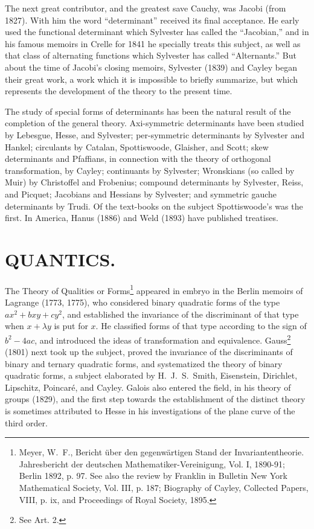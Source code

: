 \documentclass[oneside]{book}
\begin{document}
{The next great contributor, and the greatest save Cauchy, was Jacobi
(from 1827). With him the word ``determinant'' received its final
acceptance. He early used the functional determinant which Sylvester
has called the ``Jacobian,'' and in his famous memoirs in Crelle for
1841 he specially treats this subject, as well as that class of
alternating functions which Sylvester has called ``Alternants.'' But
about the time of Jacobi's closing memoirs, Sylvester (1839) and
Cayley began their great work, a work which it is impossible to
briefly summarize, but which represents the development of the
theory to the present time.

The study of special forms of determinants has been the natural
result of the completion of the general theory. Axi-symmetric
determinants have been studied by Lebesgue, Hesse, and Sylvester;
per-symmetric determinants by Sylvester and Hankel; circulants by
Catalan, Spottiswoode, Glaisher, and Scott; skew determinants and
Pfaffians, in connection with the theory of orthogonal
transformation, by Cayley; continuants by Sylvester; Wronskians (so
called by Muir) by Christoffel and Frobenius; compound determinants
by Sylvester, Reiss, and Picquet; Jacobians and Hessians by
Sylvester; and symmetric gauche determinants by Trudi. Of the
text-books on the subject Spottiswoode's was the first. In America,
Hanus (1886) and Weld (1893) have published treatises.

\chapter{QUANTICS.}

The Theory of Qualities or Forms\footnote{Meyer, W.~F., Bericht
\"uber den gegenw\"artigen Stand der Invariantentheorie.
Jahresbericht der deutschen Mathematiker-Vereinigung, Vol. I,
1890-91; Berlin 1892, p. 97. See also the review by Franklin in
Bulletin New York Mathematical Society, Vol. III, p. 187; Biography
of Cayley, Collected Papers, VIII, p. ix, and Proceedings of Royal
Society, 1895.} appeared in embryo in the Berlin memoirs of Lagrange
(1773, 1775), who considered binary quadratic forms of the type
$ax^2+bxy+cy^2$, and established the invariance of the discriminant
of that type when $x+\lambda y$ is put for $x$. He classified forms
of that type according to the sign of $b^2-4ac$, and introduced the
ideas of transformation and equivalence. Gauss\footnote{See
Art. 2.} (1801) next took up the subject, proved the invariance of
the discriminants of binary and ternary quadratic forms, and
systematized the theory of binary quadratic forms, a subject
elaborated by H.~J.~S.~Smith, Eisenstein, Dirichlet, Lipschitz,
Poincar\'e, and Cayley. Galois also entered the field, in his
theory of groups (1829), and the first step towards the
establishment of the distinct theory is sometimes attributed to
Hesse in his investigations of the plane curve of the third order.

}
\end{document}
